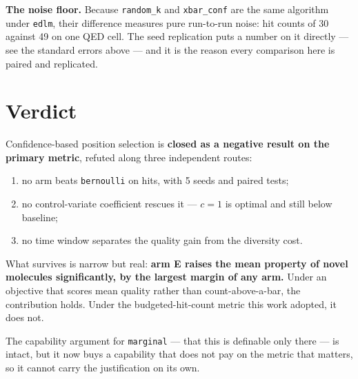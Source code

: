 \documentclass[11pt]{article}
\begin{document}
\textbf{The noise floor.} Because \texttt{random\_k} and \texttt{xbar\_conf} are
the same algorithm under \texttt{edlm}, their difference measures pure run-to-run
noise: hit counts of 30 against 49 on one QED cell. The seed replication puts a
number on it directly --- see the standard errors above --- and it is the reason
every comparison here is paired and replicated.

\section{Verdict}

Confidence-based position selection is \textbf{closed as a negative result on the
primary metric}, refuted along three independent routes:

\begin{enumerate}
  \item no arm beats \texttt{bernoulli} on hits, with 5 seeds and paired tests;
  \item no control-variate coefficient rescues it --- $c=1$ is optimal and still
        below baseline;
  \item no time window separates the quality gain from the diversity cost.
\end{enumerate}

What survives is narrow but real: \textbf{arm E raises the mean property of novel
molecules significantly, by the largest margin of any arm.} Under an objective
that scores mean quality rather than count-above-a-bar, the contribution holds.
Under the budgeted-hit-count metric this work adopted, it does not.

The capability argument for \texttt{marginal} --- that this is definable only
there --- is intact, but it now buys a capability that does not pay on the metric
that matters, so it cannot carry the justification on its own.
\end{document}
